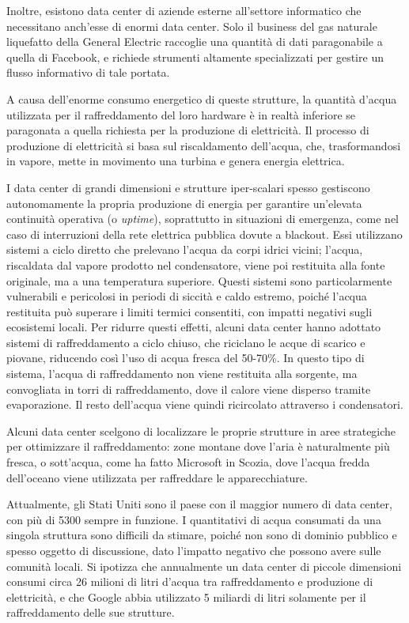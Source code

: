 \documentclass[12pt,a4paper,oneside]{book}
\begin{document}
Inoltre, esistono data center di aziende esterne all'settore informatico che necessitano anch'esse di enormi data center. Solo il business del gas naturale liquefatto della General Electric raccoglie una quantità di dati paragonabile a quella di Facebook, e richiede strumenti altamente specializzati per gestire un flusso informativo di tale portata. \citep[p.40]{srnicek2017platform}

A causa dell'enorme consumo energetico di queste strutture, la quantità d'acqua utilizzata per il raffreddamento del loro hardware è in realtà inferiore se paragonata a quella richiesta per la produzione di elettricità. Il processo di produzione di elettricità si basa sul riscaldamento dell'acqua, che, trasformandosi in vapore, mette in movimento una turbina e genera energia elettrica.

I data center di grandi dimensioni e strutture iper-scalari spesso gestiscono autonomamente la propria produzione di energia per garantire un'elevata continuità operativa (o \textit{uptime}), soprattutto in situazioni di emergenza, come nel caso di interruzioni della rete elettrica pubblica dovute a blackout.
Essi utilizzano sistemi a ciclo diretto che prelevano l'acqua da corpi idrici vicini; l'acqua, riscaldata dal vapore prodotto nel condensatore, viene poi restituita alla fonte originale, ma a una temperatura superiore. Questi sistemi sono particolarmente vulnerabili e pericolosi in periodi di siccità e caldo estremo, poiché l'acqua restituita può superare i limiti termici consentiti, con impatti negativi sugli ecosistemi locali.
Per ridurre questi effetti, alcuni data center hanno adottato sistemi di raffreddamento a ciclo chiuso, che riciclano le acque di scarico e piovane, riducendo così l'uso di acqua fresca del 50-70\%. In questo tipo di sistema, l'acqua di raffreddamento non viene restituita alla sorgente, ma convogliata in torri di raffreddamento, dove il calore viene disperso tramite evaporazione. Il resto dell'acqua viene quindi ricircolato attraverso i condensatori.

Alcuni data center scelgono di localizzare le proprie strutture in aree strategiche per ottimizzare il raffreddamento: zone montane dove l'aria è naturalmente più fresca, o sott'acqua, come ha fatto Microsoft in Scozia, dove l'acqua fredda dell'oceano viene utilizzata per raffreddare le apparecchiature.

Attualmente, gli Stati Uniti sono il paese con il maggior numero di data center, con più di 5300 sempre in funzione. I quantitativi di acqua consumati da una singola struttura sono difficili da stimare, poiché non sono di dominio pubblico e spesso oggetto di discussione, dato l'impatto negativo che possono avere sulle comunità locali. Si ipotizza che annualmente un data center di piccole dimensioni consumi circa 26 milioni di litri d'acqua tra raffreddamento e produzione di elettricità, e che Google abbia utilizzato 5 miliardi di litri solamente per il raffreddamento delle sue strutture.
\end{document}
